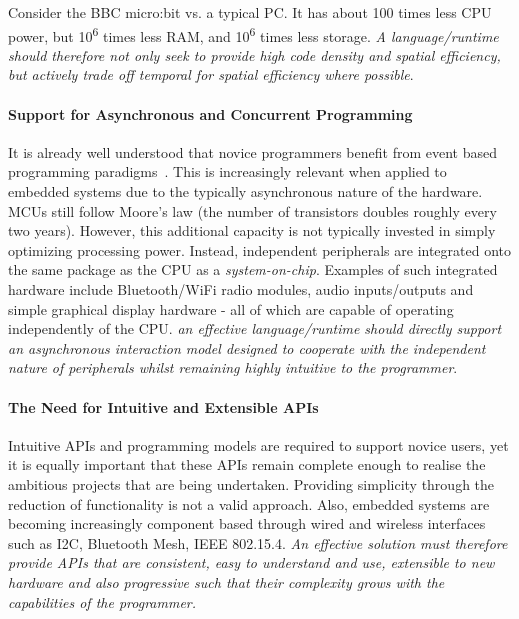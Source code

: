 Consider the BBC micro:bit vs. a typical PC. It has about 100 times less CPU power, but 10\textsuperscript{6} times less RAM, and 10\textsuperscript{6} times less storage. \emph{A language/runtime should therefore not only seek to provide high code density and spatial efficiency, but actively trade off temporal for spatial efficiency where possible}.

\paragraph{Support for Asynchronous and Concurrent Programming}
It is already well understood that novice programmers benefit from  event based programming paradigms~\cite{maloney2008programming,maloney2010scratch,turbak2014events}. This is increasingly relevant when applied to embedded systems due to the typically asynchronous nature of the hardware. MCUs still follow Moore's law (the number of transistors doubles roughly every two years). However, this additional capacity is not typically invested in simply optimizing processing power. Instead, independent peripherals are integrated onto the same package as the CPU as a \emph{system-on-chip}. Examples  of such integrated hardware include Bluetooth/WiFi radio modules, audio inputs/outputs and simple graphical display hardware - all of which are capable of operating independently of the CPU. \emph{an effective language/runtime should directly support an asynchronous interaction model designed to cooperate with the independent nature of peripherals whilst remaining highly intuitive to the programmer}.

\paragraph{The Need for Intuitive and Extensible APIs}
Intuitive APIs and programming models are required to support novice users, yet it is equally important that these APIs remain complete enough to realise the ambitious projects that are being undertaken. Providing simplicity through the reduction of functionality is not a valid approach. Also, embedded systems are becoming increasingly component based through wired and wireless interfaces such as I2C, Bluetooth Mesh, IEEE 802.15.4. \emph{An effective solution must therefore provide APIs that are consistent, easy to understand and use, extensible to new hardware and also progressive such that their complexity grows with the capabilities of the programmer.}

